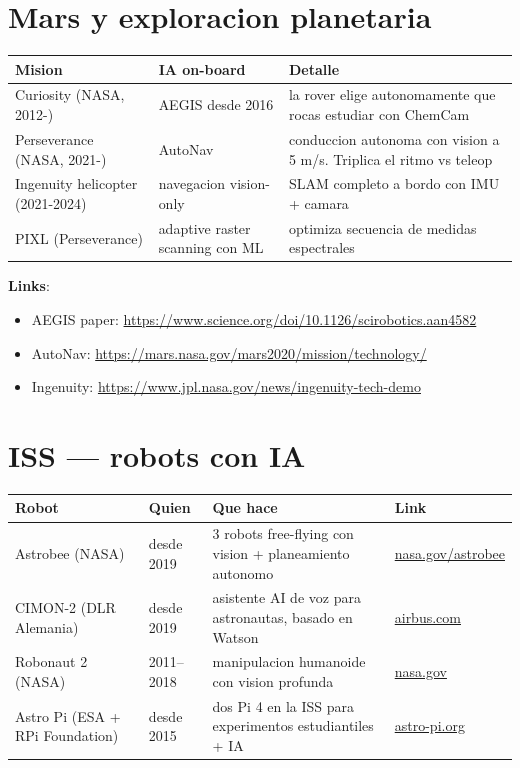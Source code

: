 \documentclass[11pt,a4paper,oneside]{report}
\begin{document}
\chapter{Mars y exploracion planetaria}

\begin{longtable}{p{3.5cm}p{4cm}p{8cm}}
\toprule
\textbf{Mision} & \textbf{IA on-board} & \textbf{Detalle} \\
\midrule
\endhead
Curiosity (NASA, 2012-) & AEGIS desde 2016 & la rover elige autonomamente que rocas estudiar con ChemCam \\
Perseverance (NASA, 2021-) & AutoNav & conduccion autonoma con vision a 5 m/s. Triplica el ritmo vs teleop \\
Ingenuity helicopter (2021-2024) & navegacion vision-only & SLAM completo a bordo con IMU + camara \\
PIXL (Perseverance) & adaptive raster scanning con ML & optimiza secuencia de medidas espectrales \\
\bottomrule
\end{longtable}

\textbf{Links}:
\begin{itemize}[leftmargin=2em]
  \item AEGIS paper: \url{https://www.science.org/doi/10.1126/scirobotics.aan4582}
  \item AutoNav: \url{https://mars.nasa.gov/mars2020/mission/technology/}
  \item Ingenuity: \url{https://www.jpl.nasa.gov/news/ingenuity-tech-demo}
\end{itemize}

\chapter{ISS — robots con IA}

\begin{longtable}{p{3cm}p{3cm}p{6cm}p{3cm}}
\toprule
\textbf{Robot} & \textbf{Quien} & \textbf{Que hace} & \textbf{Link} \\
\midrule
\endhead
Astrobee (NASA)        & desde 2019 & 3 robots free-flying con vision + planeamiento autonomo & \href{https://www.nasa.gov/astrobee}{nasa.gov/astrobee} \\
CIMON-2 (DLR Alemania) & desde 2019 & asistente AI de voz para astronautas, basado en Watson & \href{https://www.airbus.com/en/cimon}{airbus.com} \\
Robonaut 2 (NASA)      & 2011--2018 & manipulacion humanoide con vision profunda & \href{https://robonaut.jsc.nasa.gov}{nasa.gov} \\
Astro Pi (ESA + RPi Foundation) & desde 2015 & dos Pi 4 en la ISS para experimentos estudiantiles + IA & \href{https://astro-pi.org}{astro-pi.org} \\
\bottomrule
\end{longtable}
\end{document}
